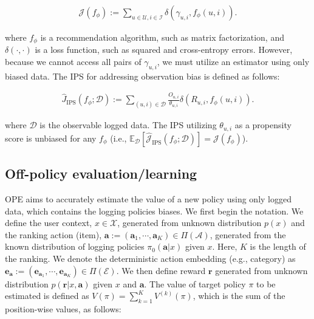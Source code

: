 \documentclass[a4paper,10pt]{article} %
\begin{document}
\begin{multicols}{2}
\vspace{-5mm}
\begin{align*}
    \mathcal{J}(f_{\phi}) := \sum_{u \in \mathcal{U},i \in \mathcal{I}} \delta(\gamma_{u,i}, f_{\phi}(u,i)).
\end{align*}
\vspace{-5mm}

where \( f_{\phi} \) is a recommendation algorithm, such as matrix factorization, and \( \delta(\cdot,\cdot) \) is a loss function, such as squared and cross-entropy errors. However, because we cannot access all pairs of \( \gamma_{u,i} \), we must utilize an estimator using only biased data. The IPS for addressing observation bias \cite{schnabel2016recommendations,saito2020unbiased} is defined as follows:

\vspace{-5mm}
\begin{align}
    \hat{J}_{\text{IPS}}(f_{\phi};\mathcal{D}) := \sum_{(u,i) \in \mathcal{D}} \frac{O_{u,i}}{\theta_{u,i}} \delta(R_{u,i}, f_{\phi}(u,i)).
\end{align}
\vspace{-3mm}

where \( \mathcal{D} \) is the observable logged data. The IPS utilizing \( \theta_{u,i} \) as a propensity score is unbiased for any \( f_{\phi} \) (i.e., \( \mathbb{E}_{\mathcal{D}}[\hat{\mathcal{J}}_{\text{IPS}}(f_{\phi};\mathcal{D})] = \mathcal{J}(f_{\phi}) \)).

\subsection{Off-policy evaluation/learning}
OPE aims to accurately estimate the value of a new policy using only logged data, which contains the logging policies biases. We first begin the notation. We define the user context, \( x \in \mathcal{X} \), generated from unknown distribution \( p(x) \) and the ranking action (item), \( \boldsymbol{a} := (\boldsymbol{a}_1,\cdots,\boldsymbol{a}_K) \in \Pi(\mathcal{A}) \), generated from the known distribution of logging policies \( \pi_{0}(\boldsymbol{a}|x) \) given \( x \). Here, \( K \) is the length of the ranking. We denote the deterministic action embedding (e.g., category) as \( \boldsymbol{e}_{\boldsymbol{a}} := (\boldsymbol{e}_{\boldsymbol{a}_1},\cdots,\boldsymbol{e}_{\boldsymbol{a}_K}) \in \Pi(\mathcal{E}) \).
We then define reward \( \boldsymbol{r} \) generated from unknown distribution \( p(\boldsymbol{r}|x,\boldsymbol{a}) \) given \( x \) and \( \boldsymbol{a} \). The value of target policy \( \pi \) to be estimated is defined as \( V(\pi) = \sum_{k=1}^{K} V^{(k)}(\pi) \), which is the sum of the position-wise values, as follows:


\end{multicols}
\end{document}
